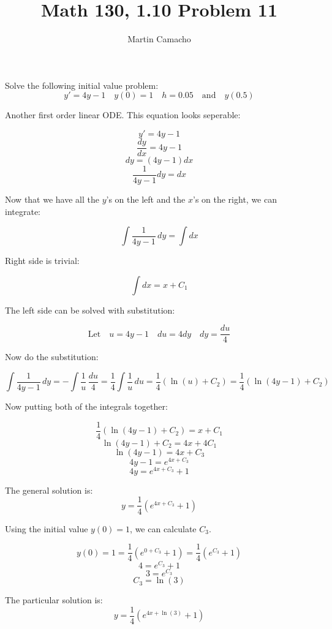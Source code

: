 \documentclass{article}
\begin{document}
\title{Math 130, 1.10 Problem 11}

\author{Martin Camacho}
\maketitle

Solve the following initial value problem:
\[ 
  y' = 4y - 1 \quad
  y(0) = 1  \quad h = 0.05 \quad \textrm{and} \quad y(0.5)
\]

Another first order linear ODE. This equation looks seperable:

\[y' = 4y - 1\]
\[\frac{dy}{dx} = 4y - 1\]
\[dy = (4y - 1)dx\]
\[\frac{1}{4y - 1}dy = dx\]

Now that we have all the \(y\)'s on the left and the \(x\)'s on the right, we can integrate:

\[ \int \frac{1}{4y - 1} \,dy = \int dx \]

Right side is trivial:

\[\int dx = x + C_1\]

The left side can be solved with substitution:

\[\textrm{Let} \quad u = 4y - 1 \quad du = 4dy \quad dy = \frac{du}{4}\]

Now do the substitution:

\[\int \frac{1}{4y - 1} \,dy = -\int \frac{1}{u} \,\frac{du}{4} = \frac{1}{4}\int \frac{1}{u} \,du = \frac{1}{4}(\ln(u) + C_2) = \frac{1}{4}(\ln(4y -1) + C_2)\]

Now putting both of the integrals together:

\[\frac{1}{4}(\ln(4y -1) + C_2) = x + C_1\]
\[\ln(4y -1) + C_2 = 4x + 4C_1\]
\[\ln(4y -1) = 4x + C_3\]
\[4y - 1 = e^{4x + C_3}\]
\[4y = e^{4x + C_3} +1 \]

The general solution is:
\[y = \frac{1}{4}(e^{4x + C_3} +1 )\]

Using the initial value  \(y(0) = 1\), we can calculate  \(C_3\).

\[y(0) = 1 = \frac{1}{4}(e^{0 + C_3} +1 ) = \frac{1}{4}(e^{C_3} +1 )\]
\[4 = e^{C_3} + 1\]
\[3 = e^{C_3}\]
\[C_3 = \ln(3)\]

The particular solution is:
\[y = \frac{1}{4}(e^{4x + \ln(3)} +1 )\]
\end{document}
